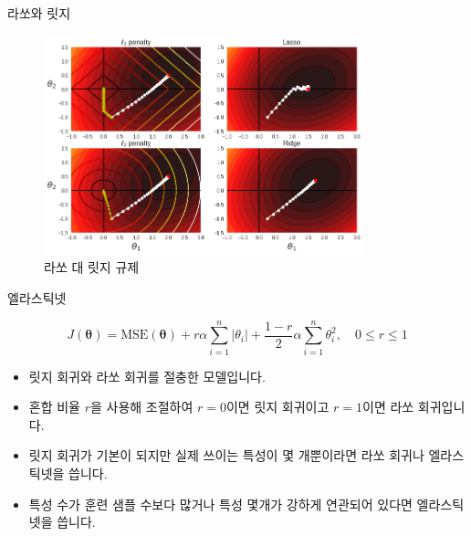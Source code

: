 \documentclass{beamer}
\numberwithin{equation}{section}
\begin{document}
\begin{frame}{라쏘와 릿지}

\begin{figure}
\includegraphics[width=25em]{./images/lasso_vs_ridge}
\caption{\label{fig:lasso_vs_ridge}라쏘 대 릿지 규제}
\end{figure}

\end{frame}


\begin{frame}{엘라스틱넷}

\begin{equation}
J(\boldsymbol{\theta}) = \text{MSE}(\boldsymbol{\theta}) + r \alpha \sum\limits_{i=1}^{n}\left| \theta_i \right| + \dfrac{1 - r}{2} \alpha \sum\limits_{i=1}^{n}{\theta_i^2}, \quad 0 \leq r \leq 1
\end{equation}

\vskip 0.5cm

\begin{itemize}
\item 릿지 회귀와 라쏘 회귀를 절충한 모델입니다.
\vskip 0.25cm
\item 혼합 비율 $r$을 사용해 조절하여 $r=0$이면 릿지 회귀이고 $r=1$이면 라쏘 회귀입니다.
\vskip 0.25cm
\item 릿지 회귀가 기본이 되지만 실제 쓰이는 특성이 몇 개뿐이라면 라쏘 회귀나 엘라스틱넷을 씁니다.
\vskip 0.25cm
\item 특성 수가 훈련 샘플 수보다 많거나 특성 몇개가 강하게 연관되어 있다면 엘라스틱넷을 씁니다.
\end{itemize}

\end{frame}

\end{document}
